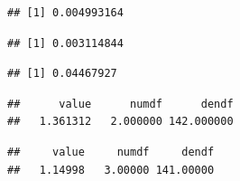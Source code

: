 \documentclass[]{article}
\newenvironment{Shaded}{\begin{snugshade}}{\end{snugshade}}
\newcommand{\OperatorTok}[1]{\textcolor[rgb]{0.81,0.36,0.00}{\textbf{#1}}}
\newcommand{\NormalTok}[1]{#1}
\begin{document}
\begin{Shaded}
\end{Shaded}

\begin{verbatim}
## [1] 0.004993164
\end{verbatim}

\begin{Shaded}
\end{Shaded}

\begin{verbatim}
## [1] 0.003114844
\end{verbatim}

\begin{Shaded}
\end{Shaded}

\begin{verbatim}
## [1] 0.04467927
\end{verbatim}

\begin{Shaded}
\end{Shaded}

\begin{verbatim}
##      value      numdf      dendf 
##   1.361312   2.000000 142.000000
\end{verbatim}

\begin{Shaded}
\end{Shaded}

\begin{verbatim}
##     value     numdf     dendf 
##   1.14998   3.00000 141.00000
\end{verbatim}
\end{document}
